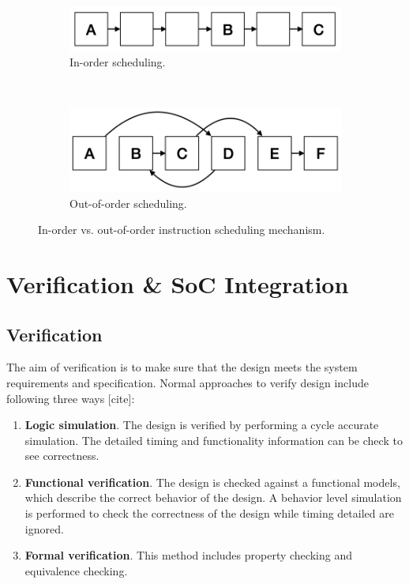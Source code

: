 \begin{figure}
    \centering
    \begin{subfigure}{0.4\textwidth}
        \includegraphics[width=\textwidth]{figure/in-order.png}
        \caption{In-order scheduling.}
        \label{fig:o3-1}
    \end{subfigure}
    ~
    \begin{subfigure}{0.4\textwidth}
        \includegraphics[width=\textwidth]{figure/out-of-order.png}
        \caption{Out-of-order scheduling.}
        \label{fig:o3-2}
    \end{subfigure}
    \caption{In-order vs. out-of-order instruction scheduling mechanism.}
    \label{fig:o3}
\end{figure}

\section{Verification \& SoC Integration} %


\subsection{Verification}
The aim of verification is to make sure that the design meets the system requirements and specification. Normal approaches to verify design include following three ways [cite]:
\begin{enumerate}
    \item \textbf{Logic simulation}. The design is verified by performing a cycle accurate simulation. The detailed timing and functionality information can be check to see correctness.
    \item \textbf{Functional verification}. The design is checked against a functional models, which describe the correct behavior of the design. A behavior level simulation is performed to check the correctness of the design while timing detailed are ignored.
    \item \textbf{Formal verification}. This method includes property checking and equivalence checking.
\end{enumerate}

